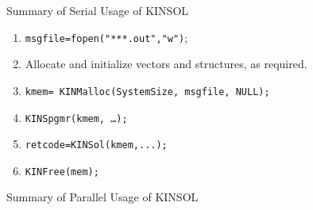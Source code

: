 \documentclass[11pt]{article}
\begin{document}
\noindent
{Summary of Serial Usage of KINSOL} \label{serial-usage}
\vspace{.2 in}
\begin{enumerate}

\item {\tt msgfile=fopen("***.out","w")};

\item Allocate and initialize vectors and structures, as required.

\item  {\tt kmem= KINMalloc(SystemSize, msgfile,  NULL);}

\item  {\tt KINSpgmr(kmem, \ldots);}

\item  {\tt retcode=KINSol(kmem,...);}
    
\item  {\tt KINFree(mem);}

\end{enumerate}
\vspace{.2 in}
{Summary of Parallel Usage of KINSOL} \label{parallel-usage}
\vspace{.2 in}
\end{document}
